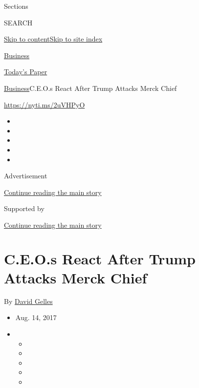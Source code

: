Sections

SEARCH

\protect\hyperlink{site-content}{Skip to
content}\protect\hyperlink{site-index}{Skip to site index}

\href{https://www.nytimes3xbfgragh.onion/section/business}{Business}

\href{https://myaccount.nytimes3xbfgragh.onion/auth/login?response_type=cookie\&client_id=vi}{}

\href{https://www.nytimes3xbfgragh.onion/section/todayspaper}{Today's
Paper}

\href{/section/business}{Business}\textbar{}C.E.O.s React After Trump
Attacks Merck Chief

\href{https://nyti.ms/2uVHPyO}{https://nyti.ms/2uVHPyO}

\begin{itemize}
\item
\item
\item
\item
\item
\end{itemize}

Advertisement

\protect\hyperlink{after-top}{Continue reading the main story}

Supported by

\protect\hyperlink{after-sponsor}{Continue reading the main story}

\hypertarget{ceos-react-after-trump-attacks-merck-chief}{%
\section{C.E.O.s React After Trump Attacks Merck
Chief}\label{ceos-react-after-trump-attacks-merck-chief}}

By \href{http://www.nytimes3xbfgragh.onion/by/david-gelles}{David
Gelles}

\begin{itemize}
\item
  Aug. 14, 2017
\item
  \begin{itemize}
  \item
  \item
  \item
  \item
  \item
  \end{itemize}
\end{itemize}

